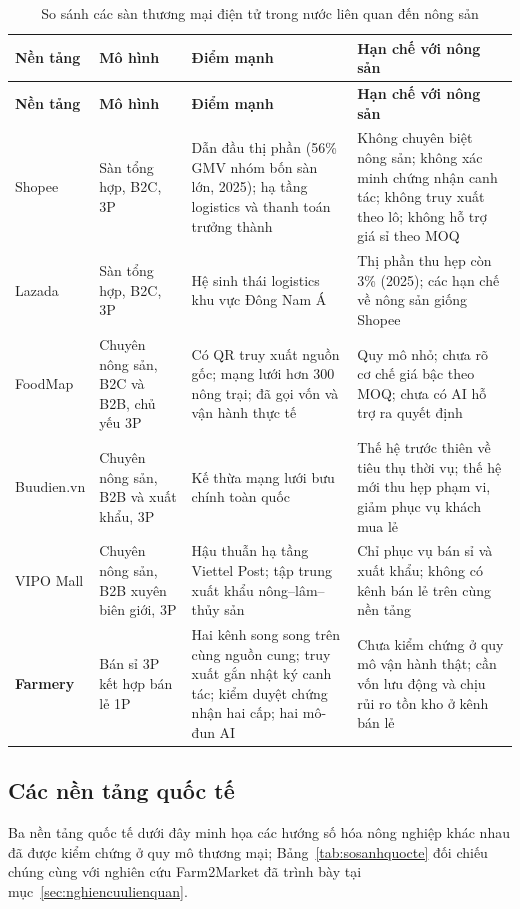 \begingroup
\tblsetup\tblzebra
\begin{longtable}{L{2.53cm} L{3.13cm} L{4.44cm} L{4.44cm}}
\caption{So sánh các sàn thương mại điện tử trong nước liên quan đến nông sản}
\label{tab:sosanhtrongnuoc} \\
\toprule
{}
\textbf{Nền tảng} & \textbf{Mô hình} & \textbf{Điểm mạnh} & \textbf{Hạn chế với nông sản} \\
\midrule
\endfirsthead
\toprule
{}
\textbf{Nền tảng} & \textbf{Mô hình} & \textbf{Điểm mạnh} & \textbf{Hạn chế với nông sản} \\
\midrule
\endhead
\bottomrule
\endfoot
Shopee & Sàn tổng hợp, B2C, 3P & Dẫn đầu thị phần (56\% GMV nhóm bốn sàn lớn, 2025); hạ tầng logistics và thanh toán trưởng thành & Không chuyên biệt nông sản; không xác minh chứng nhận canh tác; không truy xuất theo lô; không hỗ trợ giá sỉ theo MOQ \\
Lazada & Sàn tổng hợp, B2C, 3P & Hệ sinh thái logistics khu vực Đông Nam Á & Thị phần thu hẹp còn 3\% (2025); các hạn chế về nông sản giống Shopee \\
FoodMap & Chuyên nông sản, B2C và B2B, chủ yếu 3P & Có QR truy xuất nguồn gốc; mạng lưới hơn 300 nông trại; đã gọi vốn và vận hành thực tế & Quy mô nhỏ; chưa rõ cơ chế giá bậc theo MOQ; chưa có AI hỗ trợ ra quyết định \\
Buudien.vn & Chuyên nông sản, B2B và xuất khẩu, 3P & Kế thừa mạng lưới bưu chính toàn quốc & Thế hệ trước thiên về tiêu thụ thời vụ; thế hệ mới thu hẹp phạm vi, giảm phục vụ khách mua lẻ \\
VIPO Mall & Chuyên nông sản, B2B xuyên biên giới, 3P & Hậu thuẫn hạ tầng Viettel Post; tập trung xuất khẩu nông--lâm--thủy sản & Chỉ phục vụ bán sỉ và xuất khẩu; không có kênh bán lẻ trên cùng nền tảng \\
\textbf{Farmery} & Bán sỉ 3P kết hợp bán lẻ 1P & Hai kênh song song trên cùng nguồn cung; truy xuất gắn nhật ký canh tác; kiểm duyệt chứng nhận hai cấp; hai mô-đun AI & Chưa kiểm chứng ở quy mô vận hành thật; cần vốn lưu động và chịu rủi ro tồn kho ở kênh bán lẻ \\
\end{longtable}
\endgroup

\subsection{Các nền tảng quốc tế}
\label{subsec:sosanhquocte}

Ba nền tảng quốc tế dưới đây minh họa các hướng số hóa nông nghiệp khác nhau đã được kiểm chứng ở quy mô thương mại; Bảng~\ref{tab:sosanhquocte} đối chiếu chúng cùng với nghiên cứu Farm2Market đã trình bày tại mục~\ref{sec:nghiencuulienquan}.

